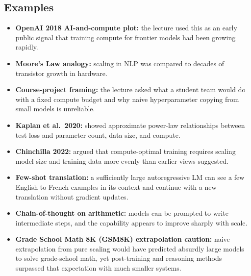 \documentclass[11pt]{article}
\begin{document}
\subsection{Examples}
\begin{itemize}
    \item \textbf{OpenAI 2018 AI-and-compute plot:} the lecture used this as an early public signal that training compute for frontier models had been growing rapidly.
    \item \textbf{Moore's Law analogy:} scaling in NLP was compared to decades of transistor growth in hardware.
    \item \textbf{Course-project framing:} the lecture asked what a student team would do with a fixed compute budget and why naive hyperparameter copying from small models is unreliable.
    \item \textbf{Kaplan et al.\ 2020:} showed approximate power-law relationships between test loss and parameter count, data size, and compute.
    \item \textbf{Chinchilla 2022:} argued that compute-optimal training requires scaling model size and training data more evenly than earlier views suggested.
    \item \textbf{Few-shot translation:} a sufficiently large autoregressive LM can see a few English-to-French examples in its context and continue with a new translation without gradient updates.
    \item \textbf{Chain-of-thought on arithmetic:} models can be prompted to write intermediate steps, and the capability appears to improve sharply with scale.
    \item \textbf{Grade School Math 8K (GSM8K) extrapolation caution:} naive extrapolation from pure scaling would have predicted absurdly large models to solve grade-school math, yet post-training and reasoning methods surpassed that expectation with much smaller systems.
\end{itemize}
\end{document}
